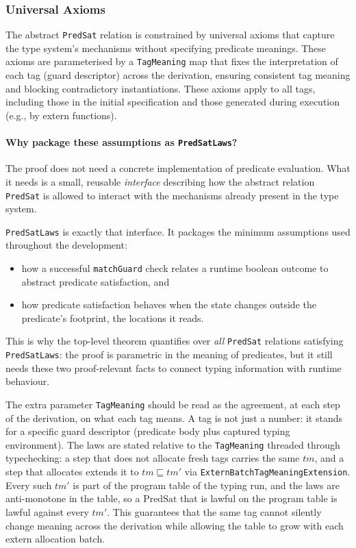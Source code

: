 \documentclass[12pt]{article}
\begin{document}
\subsubsection{Universal Axioms}

The abstract \texttt{PredSat} relation is constrained by universal axioms that
capture the type system's mechanisms without specifying predicate meanings.
These axioms are parameterised by a \texttt{TagMeaning} map that fixes the
interpretation of each tag (guard descriptor) across the derivation, ensuring
consistent tag meaning and blocking contradictory instantiations.
These axioms apply to all tags, including those in the initial specification and
those generated during execution (e.g., by extern functions).

\paragraph{Why package these assumptions as \texttt{PredSatLaws}?}
The proof does not need a concrete implementation of predicate evaluation.
What it needs is a small, reusable \emph{interface} describing how the abstract
relation \texttt{PredSat} is allowed to interact with the mechanisms already
present in the type system.

\texttt{PredSatLaws} is exactly that interface.  It packages the minimum
assumptions used throughout the development:

\begin{itemize}
    \item how a successful \texttt{matchGuard} check relates a runtime boolean outcome to abstract predicate satisfaction, and
    \item how predicate satisfaction behaves when the state changes outside the predicate's footprint, the locations it reads.
\end{itemize}

This is why the top-level theorem quantifies over \emph{all} \texttt{PredSat}
relations satisfying \texttt{PredSatLaws}: the proof is parametric in the
meaning of predicates, but it still needs these two proof-relevant facts to
connect typing information with runtime behaviour.

The extra parameter \texttt{TagMeaning} should be read as the agreement, at
each step of the derivation, on what each tag means.  A tag is not just a
number: it stands for a specific guard descriptor (predicate body plus
captured typing environment).  The laws are stated relative to the
\texttt{TagMeaning} threaded through typechecking: a step that does not
allocate fresh tags carries the same $tm$, and a step that allocates extends
it to $tm \sqsubseteq tm'$ via \texttt{ExternBatchTagMeaningExtension}.
Every such $tm'$ is part of the program table of the typing run, and the laws
are anti-monotone in the table, so a $\text{PredSat}$ that is lawful on the
program table is lawful against every $tm'$.  This guarantees that the same tag cannot silently change
meaning across the derivation while allowing the table to grow with each extern
allocation batch.
\end{document}
